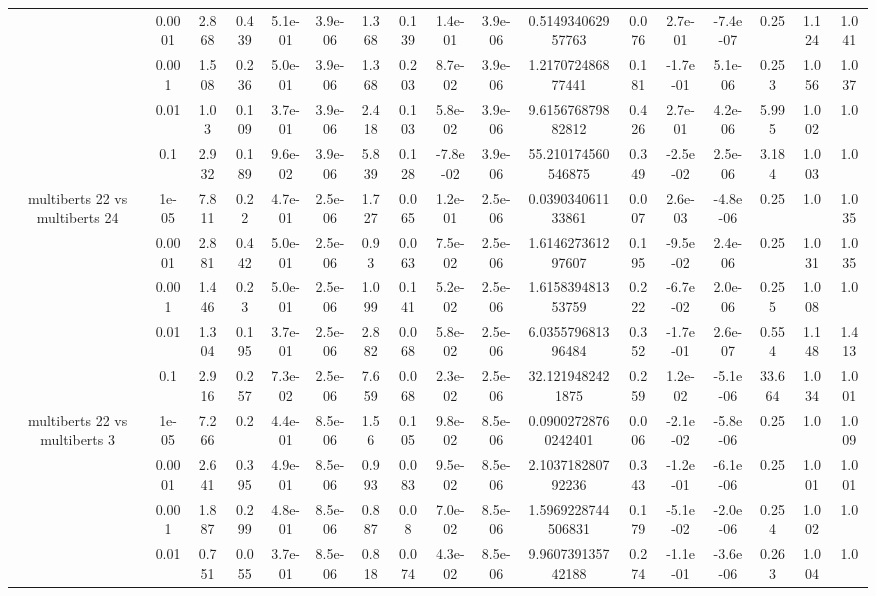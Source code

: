 \begin{tabular}{|c|c|c|c|c|c|c|c|c|c|c|c|c|c|c|c|c|}
 & 0.0001 & 2.868 & 0.439 & 5.1e-01 & 3.9e-06 & 1.368 & 0.139 & 1.4e-01 & 3.9e-06 & 0.514934062957763 & 0.076 & 2.7e-01 & -7.4e-07 & 0.25 & 1.124 & 1.041 \\
 & 0.001 & 1.508 & 0.236 & 5.0e-01 & 3.9e-06 & 1.368 & 0.203 & 8.7e-02 & 3.9e-06 & 1.217072486877441 & 0.181 & -1.7e-01 & 5.1e-06 & 0.253 & 1.056 & 1.037 \\
 & 0.01 & 1.03 & 0.109 & 3.7e-01 & 3.9e-06 & 2.418 & 0.103 & 5.8e-02 & 3.9e-06 & 9.615676879882812 & 0.426 & 2.7e-01 & 4.2e-06 & 5.995 & 1.002 & 1.0 \\
 & 0.1 & 2.932 & 0.189 & 9.6e-02 & 3.9e-06 & 5.839 & 0.128 & -7.8e-02 & 3.9e-06 & 55.210174560546875 & 0.349 & -2.5e-02 & 2.5e-06 & 3.184 & 1.003 & 1.0 \\
\hline
\multirow{5}{*}{multiberts 22 vs multiberts 24} & 1e-05 & 7.811 & 0.22 & 4.7e-01 & 2.5e-06 & 1.727 & 0.065 & 1.2e-01 & 2.5e-06 & 0.039034061133861 & 0.007 & 2.6e-03 & -4.8e-06 & 0.25 & 1.0 & 1.035 \\
 & 0.0001 & 2.881 & 0.442 & 5.0e-01 & 2.5e-06 & 0.93 & 0.063 & 7.5e-02 & 2.5e-06 & 1.614627361297607 & 0.195 & -9.5e-02 & 2.4e-06 & 0.25 & 1.031 & 1.035 \\
 & 0.001 & 1.446 & 0.23 & 5.0e-01 & 2.5e-06 & 1.099 & 0.141 & 5.2e-02 & 2.5e-06 & 1.615839481353759 & 0.222 & -6.7e-02 & 2.0e-06 & 0.255 & 1.008 & 1.0 \\
 & 0.01 & 1.304 & 0.195 & 3.7e-01 & 2.5e-06 & 2.882 & 0.068 & 5.8e-02 & 2.5e-06 & 6.035579681396484 & 0.352 & -1.7e-01 & 2.6e-07 & 0.554 & 1.148 & 1.413 \\
 & 0.1 & 2.916 & 0.257 & 7.3e-02 & 2.5e-06 & 7.659 & 0.068 & 2.3e-02 & 2.5e-06 & 32.1219482421875 & 0.259 & 1.2e-02 & -5.1e-06 & 33.664 & 1.034 & 1.001 \\
\hline
\multirow{5}{*}{multiberts 22 vs multiberts 3} & 1e-05 & 7.266 & 0.2 & 4.4e-01 & 8.5e-06 & 1.56 & 0.105 & 9.8e-02 & 8.5e-06 & 0.09002728760242401 & 0.006 & -2.1e-02 & -5.8e-06 & 0.25 & 1.0 & 1.009 \\
 & 0.0001 & 2.641 & 0.395 & 4.9e-01 & 8.5e-06 & 0.993 & 0.083 & 9.5e-02 & 8.5e-06 & 2.103718280792236 & 0.343 & -1.2e-01 & -6.1e-06 & 0.25 & 1.001 & 1.001 \\
 & 0.001 & 1.887 & 0.299 & 4.8e-01 & 8.5e-06 & 0.887 & 0.08 & 7.0e-02 & 8.5e-06 & 1.5969228744506831 & 0.179 & -5.1e-02 & -2.0e-06 & 0.254 & 1.002 & 1.0 \\
 & 0.01 & 0.751 & 0.055 & 3.7e-01 & 8.5e-06 & 0.818 & 0.074 & 4.3e-02 & 8.5e-06 & 9.960739135742188 & 0.274 & -1.1e-01 & -3.6e-06 & 0.263 & 1.004 & 1.0 \\

\end{tabular}
